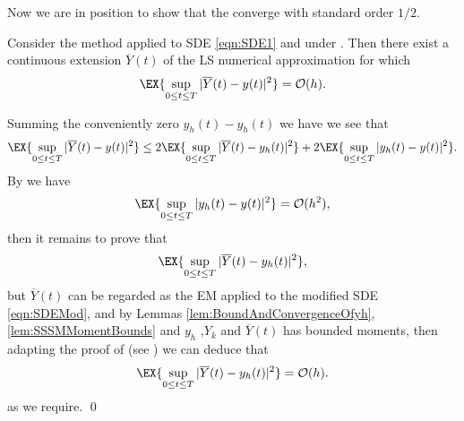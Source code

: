 	Now we are in position to show that the \SM converge with standard order $1/2$.

\begin{thm}
	Consider the \SM method applied to SDE \eqref{eqn:SDE1} and under .
	Then there exist a continuous extension $\overline{Y}(t)$ of the LS numerical approximation for which
	\begin{equation*}
		\EX{
			\sup_{0 \leq t \leq T}
			|\overline{Y}(t) - y(t)|^2	
		} = \mathcal{O}(h).	
	\end{equation*}
\end{thm}
\begin{pf}
	Summing the conveniently zero $ y_h(t) - y_h(t)$ we have we see that
	\begin{align*}
		\EX{
			\sup_{0 \leq t \leq T}	
			|\overline{Y}(t) - y(t)|^2
		}
		&\leq 
		2 \EX{
			\sup_{0 \leq t \leq T}	
			|\overline{Y}(t) - y_h(t)|^2
		}
		+
		2 \EX{
			\sup_{0 \leq t \leq T}	
			|y_h(t) - y(t) |^2
		}.\\		
	\end{align*}	
	By  we have
	$$
		\EX{
			\sup_{0 \leq t \leq T}	
			|y_h(t) - y(t) |^2 
		}= \mathcal{O}(h^2),
	$$
	then it remains to prove that 
	$$
		\EX{
			\sup_{0 \leq t \leq T}	
			|\overline{Y}(t) - y_h(t)|^2
		},
	$$
	but  $\overline{Y}(t)$ can be regarded as the EM applied to the modified SDE \eqref{eqn:SDEMod}, and by
	Lemmas \eqref{lem:BoundAndConvergenceOfyh},\eqref{lem:SSSMMomentBounds} and 
	$y_h$ ,$Y_k$ and $\overline{Y}(t)$ has bounded moments, then adapting the proof of 
	 (see \cite[Thm. 4.4]{Higham2002b}) we can deduce that
	\begin{equation*}
		\EX{
			\sup_{0 \leq t \leq T}	
			|\overline{Y}(t) - y_h(t)|^2
		} = \mathcal{O}(h).
	\end{equation*}
	as we require. \qed
\end{pf}
%